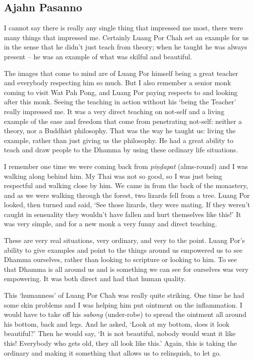 \subsection{Ajahn Pasanno}

I cannot say there is really any single thing that impressed me most, 
there were many things that impressed me. Certainly Luang Por Chah set
an example for us in the sense that he didn't just teach from theory; 
when he taught he was always present -- he was an example of what was
skilful and beautiful. 

The images that come to mind are of Luang Por himself being a great
teacher and everybody respecting him so much. But I also remember a
senior monk coming to visit Wat Pah Pong, and Luang Por paying respects
to and looking after this monk. Seeing the teaching in action without
his `being the Teacher' really impressed me. It was a very direct
teaching on not-self and a living example of the ease and freedom that
come from penetrating not-self: neither a theory, nor a Buddhist
philosophy. That was the way he taught us: living the example, rather
than just giving us the philosophy. He had a great ability to teach and
draw people to the Dhamma by using these ordinary life situations. 

I remember one time we were coming back from \emph{piṇḍapat} (alms-round)
and I was walking along behind him. My Thai was not so good, so I
was just being respectful and walking close by him. We came in from the
back of the monastery, and as we were walking through the forest, two
lizards fell from a tree. Luang Por looked, then turned and said, `See
those lizards, they were mating. If they weren't caught in sensuality
they wouldn't have fallen and hurt themselves like this!' It was very
simple, and for a new monk a very funny and direct teaching. 

These are very real situations, very ordinary, and very to the point. 
Luang Por's ability to give examples and point to the things around us
empowered us to see Dhamma ourselves, rather than looking to scripture
or looking to him. To see that Dhamma is all around us and is something
we can see for ourselves was very empowering. It was both direct and had
that human quality. 

This `humanness' of Luang Por Chah was really quite striking. One time
he had some skin problems and I was helping him put ointment on the
inflammation. I would have to take off his \emph{sabong} (under-robe) to
spread the ointment all around his bottom, back and legs. And he asked, 
`Look at my bottom, does it look beautiful?' Then he would say, `It is
not beautiful, nobody would want it like this! Everybody who gets old, 
they all look like this.' Again, this is taking the ordinary and making
it something that allows us to relinquish, to let go. 

